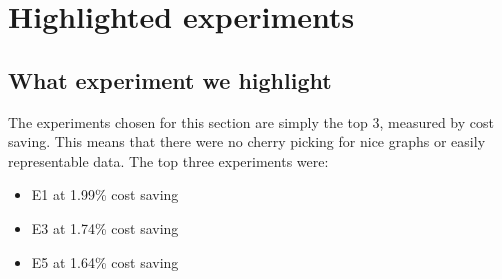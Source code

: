 \documentclass[a4paper,english]{report}
\begin{document}
	\section{Highlighted experiments}
	\label{sec:highlighted}
	\subsection{What experiment we highlight}
	The experiments chosen for this section are simply the top 3, measured by cost saving. This means that there were no cherry picking for nice graphs or easily representable data. The top three experiments were:
	\begin{itemize}
		\item E1 at 1.99\% cost saving
		\item E3 at 1.74\% cost saving
		\item E5 at 1.64\% cost saving
	\end{itemize}
\end{document}
